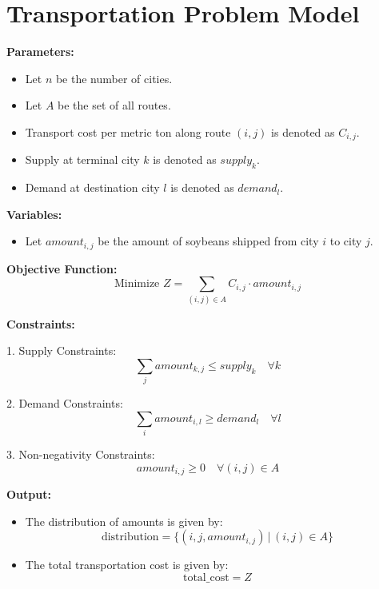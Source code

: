\documentclass{article}
\begin{document}
\section*{Transportation Problem Model}

\textbf{Parameters:}
\begin{itemize}
    \item Let \( n \) be the number of cities.
    \item Let \( A \) be the set of all routes.
    \item Transport cost per metric ton along route \( (i,j) \) is denoted as \( C_{i,j} \).
    \item Supply at terminal city \( k \) is denoted as \( supply_k \).
    \item Demand at destination city \( l \) is denoted as \( demand_l \).
\end{itemize}

\textbf{Variables:}
\begin{itemize}
    \item Let \( amount_{i,j} \) be the amount of soybeans shipped from city \( i \) to city \( j \).
\end{itemize}

\textbf{Objective Function:}
\[
\text{Minimize } Z = \sum_{(i,j) \in A} C_{i,j} \cdot amount_{i,j}
\]

\textbf{Constraints:}

1. Supply Constraints:
\[
\sum_{j} amount_{k,j} \leq supply_k \quad \forall k
\]

2. Demand Constraints:
\[
\sum_{i} amount_{i,l} \geq demand_l \quad \forall l
\]

3. Non-negativity Constraints:
\[
amount_{i,j} \geq 0 \quad \forall (i,j) \in A
\]

\textbf{Output:}
\begin{itemize}
    \item The distribution of amounts is given by:
    \[
    \text{distribution} = \{ (i, j, amount_{i,j}) \,|\, (i,j) \in A \}
    \]
    \item The total transportation cost is given by:
    \[
    \text{total\_cost} = Z
    \]
\end{itemize}
\end{document}
